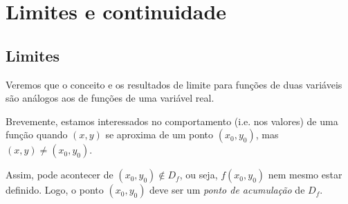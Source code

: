 \chapter{Limites e continuidade}

\section{Limites}

Veremos que o conceito e os resultados de limite para funções de duas variáveis são análogos aos de funções de uma variável real.

Brevemente, estamos interessados no comportamento (i.e. nos valores) de uma função quando \((x,y)\) se aproxima de um ponto \((x_0,y_0)\), mas \((x,y)\neq(x_0,y_0)\).

Assim, pode acontecer de \((x_0,y_0)\notin D_f\), ou seja, \(f(x_0,y_0)\) nem mesmo estar definido. Logo, o ponto \((x_0,y_0)\) deve ser um \textit{ponto de acumulação} de \(D_f\).

